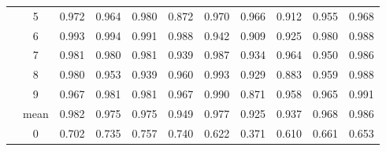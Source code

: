 \documentclass[runningheads]{llncs}
\begin{document}
\begin{table}[t!]
\begin{center}
\begin{tabular}{ccccccccccc}
	          \cite{lecun1998gradient}  &5 &\cellcolor{blue!70}0.972    &\cellcolor{blue!30}0.964 
	         &\cellcolor{blue!80} \color{white}0.980  &\cellcolor{blue!5}0.872  &\cellcolor{blue!60}0.970     &\cellcolor{blue!40}0.966      &\cellcolor{blue!15}0.912    &\cellcolor{blue!20}0.955      &\cellcolor{blue!50}0.968\\
	         
            	            &6 &\cellcolor{blue!70}0.993 &\cellcolor{blue!80}\color{white}0.994 &\cellcolor{blue!60}0.991 &\cellcolor{blue!50}0.988      &\cellcolor{blue!30}0.942    &\cellcolor{blue!10}0.909 &\cellcolor{blue!20}0.925    &\cellcolor{blue!40}0.980    &\cellcolor{blue!50}0.988\\
            	            
            	            &7 &\cellcolor{blue!60}0.981 &\cellcolor{blue!50}0.980 &\cellcolor{blue!60}0.981  &\cellcolor{blue!20}0.939     &\cellcolor{blue!80}\color{white}0.987 &\cellcolor{blue!15}0.934      &\cellcolor{blue!40}0.964    &\cellcolor{blue!30}0.950       &\cellcolor{blue!70}0.986\\
            	            
            	            &8 &\cellcolor{blue!60}0.980
            	            &\cellcolor{blue!30}0.953 &\cellcolor{blue!20}0.939   &\cellcolor{blue!50}0.960    &\cellcolor{blue!80}\color{white}0.993     &\cellcolor{blue!15}0.929      &\cellcolor{blue!5}0.883    &\cellcolor{blue!40}0.959    &\cellcolor{blue!70}0.988\\
            	            
            	            &9  &\cellcolor{blue!50}0.967 &\cellcolor{blue!60}0.981 &\cellcolor{blue!60}0.981  &\cellcolor{blue!50}0.967     &\cellcolor{blue!70}0.990     &\cellcolor{blue!10}0.871      &\cellcolor{blue!30}0.958    &\cellcolor{blue!40}0.965     &\cellcolor{blue!80}\color{white}0.991\\
            	            
            	            \midrule
            	            &mean &\cellcolor{blue!70}0.982  &\cellcolor{blue!50}0.975 &\cellcolor{blue!50}0.975 &\cellcolor{blue!30}0.949 &\cellcolor{blue!60}0.977     &\cellcolor{blue!10}0.925      &\cellcolor{blue!20}0.937    &\cellcolor{blue!40}0.968    &\cellcolor{blue!80}\color{white}0.986\\
            	            
            	            \midrule[.75pt]
&0 &\cellcolor{blue!50}0.702 &\cellcolor{blue!70}0.735  &\cellcolor{blue!80}\color{white}0.757 
                            &\cellcolor{blue!60}0.740     &\cellcolor{blue!25}0.622     &\cellcolor{blue!15}0.371      &\cellcolor{blue!20}0.610    &\cellcolor{blue!40}0.661    &\cellcolor{blue!30}0.653\\
                            

\end{tabular}
\end{center}
\end{table}
\end{document}
